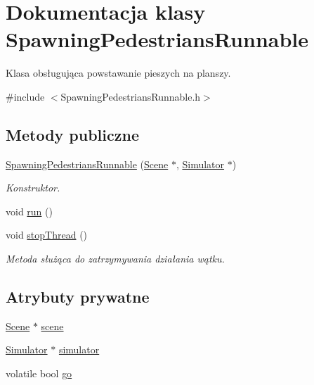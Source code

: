 \hypertarget{class_spawning_pedestrians_runnable}{\section{Dokumentacja klasy Spawning\-Pedestrians\-Runnable}
\label{class_spawning_pedestrians_runnable}
}


Klasa obsługująca powstawanie pieszych na planszy.  




{\ttfamily \#include $<$Spawning\-Pedestrians\-Runnable.\-h$>$}

\subsection*{Metody publiczne}
\begin{DoxyCompactItemize}
\item 
\hyperlink{class_spawning_pedestrians_runnable_a9d38055720541b747af740af852461bf}{Spawning\-Pedestrians\-Runnable} (\hyperlink{class_scene}{Scene} $\ast$, \hyperlink{class_simulator}{Simulator} $\ast$)
\begin{DoxyCompactList}\small\item\em Konstruktor. \end{DoxyCompactList}\item 
void \hyperlink{class_spawning_pedestrians_runnable_acba967ae5ead3b5ceab0e620417f98c4}{run} ()
\item 
void \hyperlink{class_spawning_pedestrians_runnable_aeac5a206439673b58551a247ab2c270d}{stop\-Thread} ()
\begin{DoxyCompactList}\small\item\em Metoda służąca do zatrzymywania działania wątku. \end{DoxyCompactList}\end{DoxyCompactItemize}
\subsection*{Atrybuty prywatne}
\begin{DoxyCompactItemize}
\item 
\hyperlink{class_scene}{Scene} $\ast$ \hyperlink{class_spawning_pedestrians_runnable_af9ce8e24f1f5f6ce1800192f75592023}{scene}
\item 
\hyperlink{class_simulator}{Simulator} $\ast$ \hyperlink{class_spawning_pedestrians_runnable_a5eeaca249d8d0b3ec9d263f172eee0dc}{simulator}
\item 
volatile bool \hyperlink{class_spawning_pedestrians_runnable_ad58c1c726a1f411f958d09ddab29325b}{go}
\end{DoxyCompactItemize}


